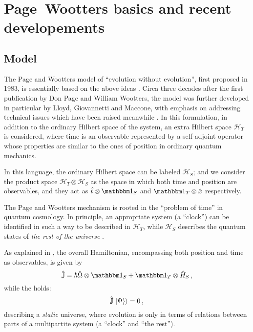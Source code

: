 \section{Page--Wootters basics and recent developements}

\subsection{Model}

The Page and Wootters model of ``evolution without evolution'',
first proposed in 1983,
is essentially based on the above ideas \parencite{PageWootters}.
Circa three decades after the first publication by
Don Page and William Wootters, the model was further developed
in particular by Lloyd, Giovannetti and Maccone,
with emphasis on addressing technical issues which have been raised meanwhile
\parencite{Lloyd:Time}.
In this formulation,
in addition to the ordinary Hilbert space of the system,
an extra Hilbert space $\mathcal{H}_T$ is considered,
where time is an observable
represented by a self-adjoint operator
whose properties are similar to the ones of position
in ordinary quantum mechanics.

In this language, the ordinary Hilbert space can be labeled $\mathcal{H}_S$;
and we consider the product space $\mathcal{H}_T \otimes \mathcal{H}_S$ as
the space in which both time and position are observables, and they act as
$\hat{t} \otimes \idop_S$ and $\idop_T \otimes \hat{x}$
respectively.


The Page and Wootters mechanism is rooted in the ``problem of time''
in quantum cosmology.
In principle, an appropriate system (a ``clock'') can be identified in such a way
to be described in $\mathcal{H}_T$, while $\mathcal{H}_S$ describes
the quantum states of \emph{the rest of the universe} \parencite{Marletto:Evolution}.

As explained in \cite{Lloyd:Time, Maccone:Pauli}, the overall Hamiltonian,
encompassing both position and time as observables, is given by
\begin{equation}\label{eq:pwHamiltonian}
  \hat{\mathbb{J}} = \hbar\hat{\Omega}\ox\idop_S + \idop_T\ox\hat{H}_S \,\text{,}
\end{equation}
while the  holds:
\begin{equation}\label{eq:Wheeler-DeWitt}
  \hat{\mathbb{J}}\left.\left| \Psi \right\rangle\right\rangle = 0 \,\text{,}
\end{equation}
describing a \emph{static} universe, where evolution is only
in terms of relations between parts of a multipartite system
(a ``clock'' and ``the rest'').

